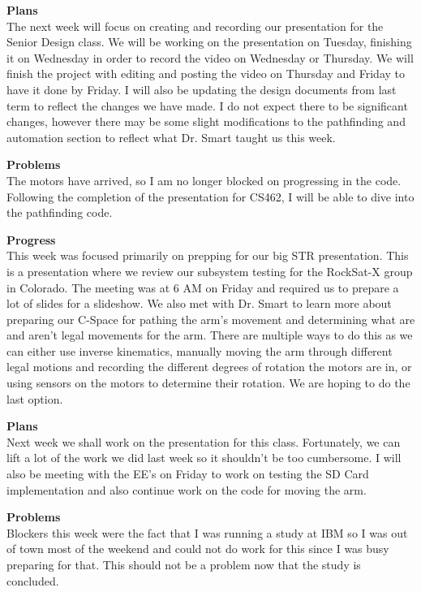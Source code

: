 \textbf{Plans} \\ 
The next week will focus on creating and recording our presentation for the Senior Design class. We will be working on the presentation on Tuesday, finishing it on Wednesday in order to record the video on Wednesday or Thursday. We will finish the project with editing and posting the video on Thursday and Friday to have it done by Friday. I will also be updating the design documents from last term to reflect the changes we have made. I do not expect there to be significant changes, however there may be some slight modifications to the pathfinding and automation section to reflect what Dr. Smart taught us this week.

\textbf{Problems} \\ 
The motors have arrived, so I am no longer blocked on progressing in the code. Following the completion of the presentation for CS462, I will be able to dive into the pathfinding code.

\textbf{Progress} \\ 
This week was focused primarily on prepping for our big STR presentation. This is a presentation where we review our 
subsystem testing for the RockSat-X group in Colorado. The meeting was at 6 AM on Friday and required us to prepare a 
lot of slides for a slideshow. We also met with Dr. Smart to learn more about preparing our C-Space for 
pathing the arm's movement and determining what are and aren't legal movements for the arm. There are multiple ways
to do this as we can either use inverse kinematics, manually moving the arm through different legal motions and 
recording the different degrees of rotation the motors are in, or using sensors on the motors to determine their 
rotation. We are hoping to do the last option.

\textbf{Plans} \\ 
Next week we shall work on the presentation for this class. Fortunately, we can lift a lot of the work we did last 
week so it shouldn't be too cumbersome. I will also be meeting with the EE's on Friday to work on testing the SD Card 
implementation and also continue work on the code for moving the arm.

\textbf{Problems} \\ 
Blockers this week were the fact that I was running a study at IBM so I was out of town most of the weekend and could 
not do work for this since I was busy preparing for that. This should not be a problem now that the study is 
concluded.

